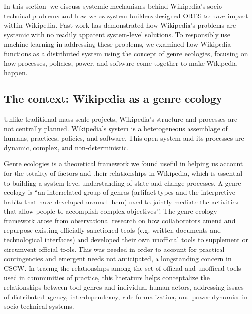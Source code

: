 In this section, we discuss systemic mechanisms behind Wikipedia's socio-technical problems and how we as system builders designed ORES to have impact within Wikipedia.  Past work has demonstrated how Wikipedia's problems are systemic with no readily apparent system-level solutions. To responsibly use machine learning in addressing these problems, we examined how Wikipedia functions as a distributed system using the concept of genre ecologies, focusing on how processes, policies, power, and software come together to make Wikipedia happen.

\subsection{The context: Wikipedia as a genre ecology}
Unlike traditional mass-scale projects, Wikipedia's structure and processes are not centrally planned. Wikipedia's system is a heterogeneous assemblage of humans, practices, policies, and software.  This open system and its processes are dynamic, complex, and non-deterministic.

Genre ecologies is a theoretical framework we found useful in helping us account for the totality of factors and their relationships in Wikipedia, which is essential to building a system-level understanding of state and change processes.  A genre ecology is ``an interrelated group of genres (artifact types and the interpretive habits that have developed around them) used to jointly mediate the activities that allow people to accomplish complex objectives.''\cite{spinuzzi2000genre}. The genre ecology framework arose from observational research on how collaborators amend and repurpose existing officially-sanctioned tools (e.g. written documents and technological interfaces) and developed their own unofficial tools to supplement or circumvent official tools. This was needed in order to account for practical contingencies and emergent needs not anticipated, a longstanding concern in CSCW. In tracing the relationships among the set of official and unofficial tools used in communities of practice, this literature helps conceptalize the relationships between tool genres and individual human actors, addressing issues of distributed agency, interdependency, rule formalization, and power dynamics in socio-technical systems\cite{spinuzzi2003tracing}.

